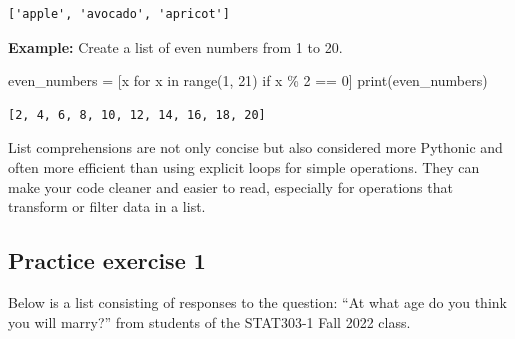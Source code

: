 \documentclass[
  letterpaper,
  DIV=11,
  numbers=noendperiod]{scrreprt}
\newenvironment{Shaded}{\begin{snugshade}}{\end{snugshade}}
\newcommand{\BuiltInTok}[1]{\textcolor[rgb]{0.00,0.23,0.31}{#1}}
\newcommand{\ControlFlowTok}[1]{\textcolor[rgb]{0.00,0.23,0.31}{#1}}
\newcommand{\DecValTok}[1]{\textcolor[rgb]{0.68,0.00,0.00}{#1}}
\newcommand{\KeywordTok}[1]{\textcolor[rgb]{0.00,0.23,0.31}{#1}}
\newcommand{\NormalTok}[1]{\textcolor[rgb]{0.00,0.23,0.31}{#1}}
\newcommand{\OperatorTok}[1]{\textcolor[rgb]{0.37,0.37,0.37}{#1}}
\begin{document}
\begin{verbatim}
['apple', 'avocado', 'apricot']
\end{verbatim}

\textbf{Example:} Create a list of even numbers from 1 to 20.

\begin{Shaded}
\begin{Highlighting}[]
\NormalTok{even\_numbers }\OperatorTok{=}\NormalTok{ [x }\ControlFlowTok{for}\NormalTok{ x }\KeywordTok{in} \BuiltInTok{range}\NormalTok{(}\DecValTok{1}\NormalTok{, }\DecValTok{21}\NormalTok{) }\ControlFlowTok{if}\NormalTok{ x }\OperatorTok{\%} \DecValTok{2} \OperatorTok{==} \DecValTok{0}\NormalTok{]}
\BuiltInTok{print}\NormalTok{(even\_numbers)}
\end{Highlighting}
\end{Shaded}

\begin{verbatim}
[2, 4, 6, 8, 10, 12, 14, 16, 18, 20]
\end{verbatim}

List comprehensions are not only concise but also considered more
Pythonic and often more efficient than using explicit loops for simple
operations. They can make your code cleaner and easier to read,
especially for operations that transform or filter data in a list.

\hypertarget{practice-exercise-1}{%
\subsection{Practice exercise 1}\label{practice-exercise-1}}

Below is a list consisting of responses to the question: ``At what age
do you think you will marry?'' from students of the STAT303-1 Fall 2022
class.
\end{document}
